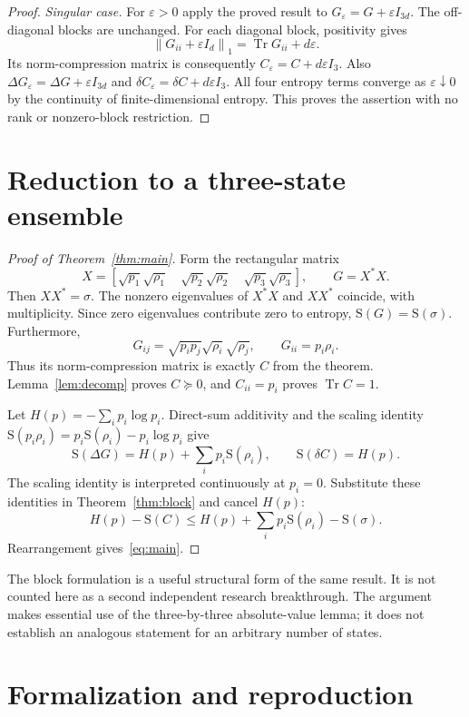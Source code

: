 \documentclass[11pt,a4paper]{article}
\newcommand{\tr}{\operatorname{Tr}}
\newcommand{\Ent}{\mathrm{S}}
\newcommand{\normone}[1]{\left\lVert #1\right\rVert_1}
\begin{document}
\begin{proof}
\emph{Singular case.} For $\varepsilon>0$ apply the proved result to
$G_\varepsilon=G+\varepsilon I_{3d}$. The off-diagonal blocks are
unchanged. For each diagonal block, positivity gives
\[
 \normone{G_{ii}+\varepsilon I_d}
 =\tr G_{ii}+d\varepsilon.
\]
Its norm-compression matrix is consequently
$C_\varepsilon=C+d\varepsilon I_3$. Also
$\Delta G_\varepsilon=\Delta G+\varepsilon I_{3d}$ and
$\delta C_\varepsilon=\delta C+d\varepsilon I_3$.
All four entropy terms converge as $\varepsilon\downarrow0$ by the
continuity of finite-dimensional entropy. This proves the assertion with
no rank or nonzero-block restriction.
\end{proof}

\section{Reduction to a three-state ensemble}

\begin{proof}[Proof of Theorem~\ref{thm:main}]
Form the rectangular matrix
\[
 X=[\sqrt{p_1}\sqrt{\rho_1}\quad
    \sqrt{p_2}\sqrt{\rho_2}\quad
    \sqrt{p_3}\sqrt{\rho_3}],\qquad G=X^*X.
\]
Then $XX^*=\sigma$. The nonzero eigenvalues of $X^*X$ and $XX^*$
coincide, with multiplicity. Since zero eigenvalues contribute zero to
entropy, $\Ent(G)=\Ent(\sigma)$. Furthermore,
\[
 G_{ij}=\sqrt{p_ip_j}\sqrt{\rho_i}\sqrt{\rho_j},
 \qquad G_{ii}=p_i\rho_i.
\]
Thus its norm-compression matrix is exactly $C$ from the theorem.
Lemma~\ref{lem:decomp} proves $C\succeq0$, and $C_{ii}=p_i$ proves
$\tr C=1$.

Let $H(p)=-\sum_i p_i\log p_i$. Direct-sum additivity and the scaling
identity
$\Ent(p_i\rho_i)=p_i\Ent(\rho_i)-p_i\log p_i$ give
\[
 \Ent(\Delta G)=H(p)+\sum_i p_i\Ent(\rho_i),
 \qquad \Ent(\delta C)=H(p).
\]
The scaling identity is interpreted continuously at $p_i=0$.
Substitute these identities in Theorem~\ref{thm:block} and cancel $H(p)$:
\[
 H(p)-\Ent(C)\le H(p)+\sum_i p_i\Ent(\rho_i)-\Ent(\sigma).
\]
Rearrangement gives~\eqref{eq:main}.
\end{proof}

The block formulation is a useful structural form of the same result. It
is not counted here as a second independent research breakthrough. The
argument makes essential use of the three-by-three absolute-value lemma;
it does not establish an analogous statement for an arbitrary number of
states.

\section{Formalization and reproduction}\label{sec:lean}
\end{document}
